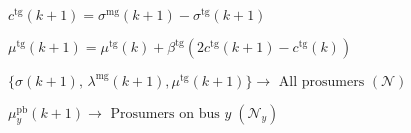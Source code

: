 \documentclass[10pt]{article}
\newcommand{\mc}{\mathcal}
\newcommand{\0}{\mathbf{0}}
\newcommand{\1}{\mathbf{1}}
\begin{document}
\begin{algorithm}[H]
\begin{algorithmic}[1]
\State
$c^{\text{tg}}(k+1) = \sigma^{\text{mg}}
	(k+1)- \sigma^{\text{tg}}(k+1)$

\State
$\mu^{\text{tg}}(k+1) = \mu^{\text{tg}}(k) + \beta^{\text{tg}} (2c^{\text{tg}}(k+1)-c^{\text{tg}}(k))$

\EndProcedure	

\State
$ \{ \sigma(k+1), \, \lambda^{\text{mg}}(k+1), \mu^{\text{tg}}(k+1) \} 
	\longrightarrow  \text{ All prosumers }(\mc N)$

\ForAll{bus $ y \in \mc B$}
\State
$\mu^{\text{pb}}_y(k+1)\longrightarrow \text{ Prosumers on bus } y \; (\mc N_y)$
\EndFor

\EndProcedure

\End	
	
	
\end{algorithmic}
\end{algorithm}
\end{document}
